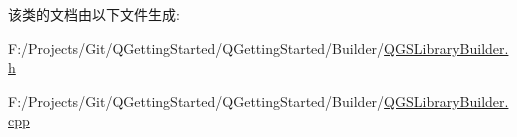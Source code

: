 该类的文档由以下文件生成\+:\begin{DoxyCompactItemize}
\item 
F\+:/\+Projects/\+Git/\+Q\+Getting\+Started/\+Q\+Getting\+Started/\+Builder/\mbox{\hyperlink{_q_g_s_library_builder_8h}{Q\+G\+S\+Library\+Builder.\+h}}\item 
F\+:/\+Projects/\+Git/\+Q\+Getting\+Started/\+Q\+Getting\+Started/\+Builder/\mbox{\hyperlink{_q_g_s_library_builder_8cpp}{Q\+G\+S\+Library\+Builder.\+cpp}}\end{DoxyCompactItemize}
